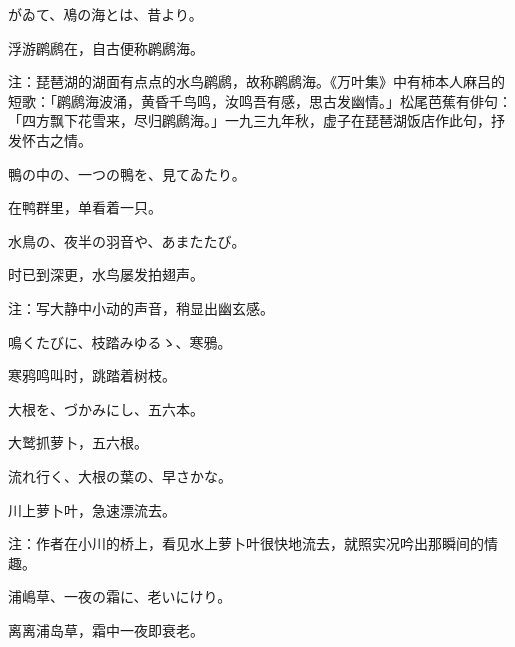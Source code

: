 \begin{haiku}
    {\FH {}がゐて、鳰の海とは、昔より。}

    {\FK 浮游䴙䴘在，自古便称䴙䴘海。}

    {\FT 注：琵琶湖的湖面有点点的水鸟䴙䴘，故称䴙䴘海。《万叶集》中有柿本人麻吕的短歌：「䴙䴘海波涌，黄昏千鸟鸣，汝鸣吾有感，思古发幽情。」松尾芭蕉有俳句：「四方飘下花雪来，尽归䴙䴘海。」一九三九年秋，虚子在琵琶湖饭店作此句，抒发怀古之情。}
\end{haiku}

\begin{haiku}
    {\FH 鴨の中の、一つの鴨を、見てゐたり。}

    {\FK 在鸭群里，单看着一只。}
\end{haiku}

\begin{haiku}
    {\FH 水鳥の、夜半の羽音や、あまたたび。}

    {\FK 时已到深更，水鸟屡发拍翅声。}

    {\FT 注：写大静中小动的声音，稍显出幽玄感。}
\end{haiku}

\begin{haiku}
    {\FH 鳴くたびに、枝踏みゆるゝ、寒鴉。}

    {\FK 寒鸦鸣叫时，跳踏着树枝。}
\end{haiku}

\begin{haiku}
    {\FH 大根を、づかみにし、五六本。}

    {\FK 大鹫抓萝卜，五六根。}
\end{haiku}

\begin{haiku}
    {\FH 流れ行く、大根の葉の、早さかな。}

    {\FK 川上萝卜叶，急速漂流去。}

    {\FT 注：作者在小川的桥上，看见水上萝卜叶很快地流去，就照实况吟出那瞬间的情趣。}
\end{haiku}

\begin{haiku}
    {\FH 浦嶋草、一夜の霜に、老いにけり。}

    {\FK 离离浦岛草，霜中一夜即衰老。}
\end{haiku}

\chapter[{\FM 水原秋櫻子}]{\FM {}}

